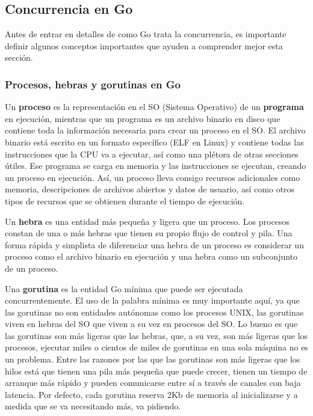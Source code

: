 \documentclass[10pt]{article} %
\begin{document}
\subsection{Concurrencia en Go}

Antes de entrar en detalles de como Go trata la concurrencia, es importante definir algunos conceptos importantes que ayuden a comprender mejor esta sección.

\subsubsection{Procesos, hebras y gorutinas en Go}

Un \textbf{proceso} es la representación en el SO (Sistema Operativo) de un \textbf{programa} en ejecución, mientras que un programa es un archivo binario en disco que contiene toda la información necesaria para crear un proceso en el SO. El archivo binario está escrito en un formato específico (ELF en Linux) y contiene todas las instrucciones que la CPU va a ejecutar, así como una plétora de otras secciones útiles. Ese programa se carga en memoria y las instrucciones se ejecutan, creando un proceso en ejecución. Así, un proceso lleva consigo recursos adicionales como memoria, descripciones de archivos abiertos y datos de usuario, así como otros tipos de recursos que se obtienen durante el tiempo de ejecución.

Un \textbf{hebra} es una entidad más pequeña y ligera que un proceso. Los procesos constan de una o más hebras que tienen su propio flujo de control y pila. Una forma rápida y simplista de diferenciar una hebra de un proceso es considerar un proceso como el archivo binario en ejecución y una hebra como un subconjunto de un proceso.

Una \textbf{gorutina} es la entidad Go mínima que puede ser ejecutada concurrentemente. El uso de la palabra mínima es muy importante aquí, ya que las gorutinas no son entidades autónomas como los procesos UNIX, las gorutinas viven en hebras del SO que viven a su vez en procesos del SO. Lo bueno es que las gorutinas son más ligeras que las hebras, que, a su vez, son más ligeras que los procesos, ejecutar miles o cientos de miles de gorutinas en una sola máquina no es un problema. Entre las razones por las que las gorutinas son más ligeras que los hilos está que tienen una pila más pequeña que puede crecer, tienen un tiempo de arranque más rápido y pueden comunicarse entre sí a través de canales con baja latencia. Por defecto, cada gorutina reserva 2Kb de memoria al inicializarse y a medida que se va necesitando más, va pidiendo.
\end{document}
